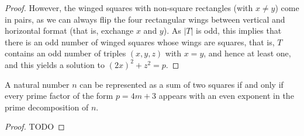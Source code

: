 \begin{proof}
However, the winged squares with non-square rectangles (with $x \neq y$) come in pairs, as we can
always flip the four rectangular wings between vertical and horizontal format
(that is, exchange $x$ and $y$). As $|T|$ is odd, this implies that there is an odd number of winged
squares whose wings are squares, that is, $T$ contains an odd number of triples $(x, y, z)$
with $x = y$, and hence at least one, and this yields a solution to $(2x)^2 + z^2 = p$.
\end{proof}

\begin{theorem}
  \label{sum_of_two_squares}
  A natural number \(n\) can be represented as a sum of two squares
  if and only if every prime factor of the form \(p = 4m + 3\) appears with an
  even exponent in the prime decomposition of \(n\).
\end{theorem}
\begin{proof}
  TODO
\end{proof}
